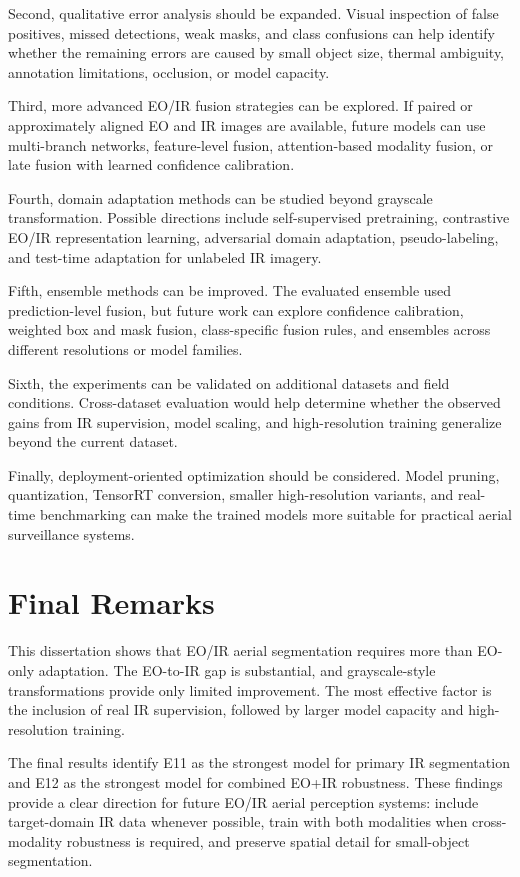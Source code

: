 Second, qualitative error analysis should be expanded. Visual inspection of false positives, missed detections, weak masks, and class confusions can help identify whether the remaining errors are caused by small object size, thermal ambiguity, annotation limitations, occlusion, or model capacity.

Third, more advanced EO/IR fusion strategies can be explored. If paired or approximately aligned EO and IR images are available, future models can use multi-branch networks, feature-level fusion, attention-based modality fusion, or late fusion with learned confidence calibration.

Fourth, domain adaptation methods can be studied beyond grayscale transformation. Possible directions include self-supervised pretraining, contrastive EO/IR representation learning, adversarial domain adaptation, pseudo-labeling, and test-time adaptation for unlabeled IR imagery.

Fifth, ensemble methods can be improved. The evaluated ensemble used prediction-level fusion, but future work can explore confidence calibration, weighted box and mask fusion, class-specific fusion rules, and ensembles across different resolutions or model families.

Sixth, the experiments can be validated on additional datasets and field conditions. Cross-dataset evaluation would help determine whether the observed gains from IR supervision, model scaling, and high-resolution training generalize beyond the current dataset.

Finally, deployment-oriented optimization should be considered. Model pruning, quantization, TensorRT conversion, smaller high-resolution variants, and real-time benchmarking can make the trained models more suitable for practical aerial surveillance systems.

\section{Final Remarks}

This dissertation shows that EO/IR aerial segmentation requires more than EO-only adaptation. The EO-to-IR gap is substantial, and grayscale-style transformations provide only limited improvement. The most effective factor is the inclusion of real IR supervision, followed by larger model capacity and high-resolution training.

The final results identify E11 as the strongest model for primary IR segmentation and E12 as the strongest model for combined EO+IR robustness. These findings provide a clear direction for future EO/IR aerial perception systems: include target-domain IR data whenever possible, train with both modalities when cross-modality robustness is required, and preserve spatial detail for small-object segmentation.
